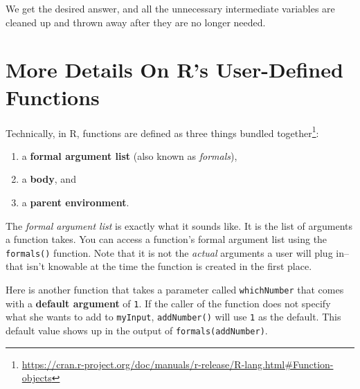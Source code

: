 \documentclass[
  12pt,
]{krantz}
\makeatletter
\newenvironment{Shaded}{\begin{snugshade}}{\end{snugshade}}
\newcommand{\AttributeTok}[1]{\textcolor[rgb]{0.61,0.61,0.61}{#1}}
\newcommand{\CommentTok}[1]{\textcolor[rgb]{0.37,0.37,0.37}{\textit{#1}}}
\newcommand{\ControlFlowTok}[1]{\textcolor[rgb]{0.27,0.27,0.27}{\textbf{#1}}}
\newcommand{\DecValTok}[1]{\textcolor[rgb]{0.06,0.06,0.06}{#1}}
\newcommand{\DocumentationTok}[1]{\textcolor[rgb]{0.37,0.37,0.37}{\textbf{\textit{#1}}}}
\newcommand{\FunctionTok}[1]{\textcolor[rgb]{0,0,0}{#1}}
\newcommand{\NormalTok}[1]{#1}
\newcommand{\OtherTok}[1]{\textcolor[rgb]{0.37,0.37,0.37}{#1}}
\newcommand{\SpecialCharTok}[1]{\textcolor[rgb]{0,0,0}{#1}}
\providecommand{\tightlist}{%
  \setlength{\itemsep}{0pt}\setlength{\parskip}{0pt}}
\renewcommand{\href}[2]{#2\footnote{\url{#1}}}
\newenvironment{kframe}{%
\medskip{}
\setlength{\fboxsep}{.8em}
 \def\at@end@of@kframe{}%
 \ifinner\ifhmode%
  \def\at@end@of@kframe{\end{minipage}}%
  \begin{minipage}{\columnwidth}%
 \fi\fi%
 \def\FrameCommand##1{\hskip\@totalleftmargin \hskip-\fboxsep
 \colorbox{shadecolor}{##1}\hskip-\fboxsep
     \hskip-\linewidth \hskip-\@totalleftmargin \hskip\columnwidth}%
 \MakeFramed {\advance\hsize-\width
   \@totalleftmargin\z@ \linewidth\hsize
   \@setminipage}}%
 {\par\unskip\endMakeFramed%
 \at@end@of@kframe}
\renewenvironment{Shaded}{\begin{kframe}}{\end{kframe}}
\makeatother
\begin{document}
We get the desired answer, and all the unnecessary intermediate variables are cleaned up and thrown away after they are no longer needed.

\hypertarget{more-details-on-rs-user-defined-functions}{%
\section{More Details On R's User-Defined Functions}\label{more-details-on-rs-user-defined-functions}}

Technically, in R, functions are \href{https://cran.r-project.org/doc/manuals/r-release/R-lang.html\#Function-objects}{defined as three things bundled together}:

\begin{enumerate}
\def\labelenumi{\arabic{enumi}.}
\tightlist
\item
  a \textbf{formal argument list} (also known as \emph{formals}),
\item
  a \textbf{body}, and
\item
  a \textbf{parent environment}.
\end{enumerate}

The \emph{formal argument list} is exactly what it sounds like. It is the list of arguments a function takes. You can access a function's formal argument list using the \texttt{formals()} function. Note that it is not the \emph{actual} arguments a user will plug in--that isn't knowable at the time the function is created in the first place.

Here is another function that takes a parameter called \texttt{whichNumber} that comes with a \textbf{default argument} of \texttt{1}. If the caller of the function does not specify what she wants to add to \texttt{myInput}, \texttt{addNumber()} will use \texttt{1} as the default. This default value shows up in the output of \texttt{formals(addNumber)}.

\begin{Shaded}
\end{Shaded}
\end{document}
